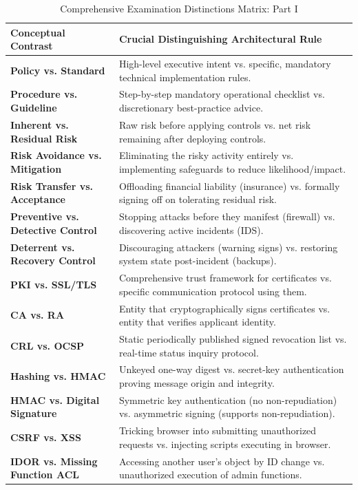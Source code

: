 \begin{table}[htbp]
\centering
\caption{Comprehensive Examination Distinctions Matrix: Part I}
\label{tab:master_distinctions_part1}
\begin{tabularx}{\textwidth}{p{4.5cm} X}
\toprule
\textbf{Conceptual Contrast} & \textbf{Crucial Distinguishing Architectural Rule} \\
\midrule
\textbf{Policy vs. Standard} & High-level executive intent vs. specific, mandatory technical implementation rules. \\
\textbf{Procedure vs. Guideline} & Step-by-step mandatory operational checklist vs. discretionary best-practice advice. \\
\textbf{Inherent vs. Residual Risk} & Raw risk before applying controls vs. net risk remaining after deploying controls. \\
\textbf{Risk Avoidance vs. Mitigation} & Eliminating the risky activity entirely vs. implementing safeguards to reduce likelihood/impact. \\
\textbf{Risk Transfer vs. Acceptance} & Offloading financial liability (insurance) vs. formally signing off on tolerating residual risk. \\
\textbf{Preventive vs. Detective Control} & Stopping attacks before they manifest (firewall) vs. discovering active incidents (IDS). \\
\textbf{Deterrent vs. Recovery Control} & Discouraging attackers (warning signs) vs. restoring system state post-incident (backups). \\
\textbf{PKI vs. SSL/TLS} & Comprehensive trust framework for certificates vs. specific communication protocol using them. \\
\textbf{CA vs. RA} & Entity that cryptographically signs certificates vs. entity that verifies applicant identity. \\
\textbf{CRL vs. OCSP} & Static periodically published signed revocation list vs. real-time status inquiry protocol. \\
\textbf{Hashing vs. HMAC} & Unkeyed one-way digest vs. secret-key authentication proving message origin and integrity. \\
\textbf{HMAC vs. Digital Signature} & Symmetric key authentication (no non-repudiation) vs. asymmetric signing (supports non-repudiation). \\
\textbf{CSRF vs. XSS} & Tricking browser into submitting unauthorized requests vs. injecting scripts executing in browser. \\
\textbf{IDOR vs. Missing Function ACL} & Accessing another user's object by ID change vs. unauthorized execution of admin functions. \\
\bottomrule
\end{tabularx}
\end{table}

